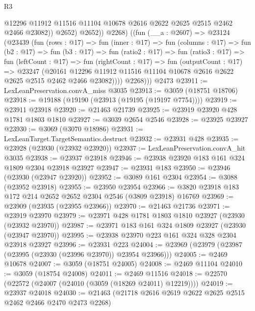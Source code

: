 \begin{lexlean}{R3}
\begin{coremodule}
                  @12296
                  @11912
                  @11516
                  @11104
                  @10678
                  @2616
                  @2622
                  @2625
                  @2515
                  @2462
                  @2466
                  @23082))
              @2652)
            @2652))
          @2268)
        ((fun (__a : @2607) =>
        @23124
          (@23439
            (fun (rows : @17) =>
            fun (inner : @17) =>
            fun (columns : @17) =>
            fun (b2 : @17) =>
            fun (b3 : @17) =>
            fun (ratio2 : @17) =>
            fun (ratio3 : @17) =>
            fun (leftCount : @17) =>
            fun (rightCount : @17) =>
            fun (outputCount : @17) =>
            @23247
              (@20161
                @12296
                @11912
                @11516
                @11104
                @10678
                @2616
                @2622
                @2625
                @2515
                @2462
                @2466
                @23082))))
          @2268)))
    @2473
@23911 := LexLeanPreservation.convA_miss @3035
@23913 := @3059 (@18751 @18706)
@23918 := @19188 (@19190 (@23913 (@19195 (@19197 @7754))))
@23919 := @23911 @23918
@23920 := @21463 @21739
@23925 := @23919 @23920 @428 @1781 @1803 @1810
@23927 := @3039 @2654 @2546
@23928 := @23925 @23927
@23930 := @3069 (@3070 @18986)
@23931 := LexLeanTarget.TargetSemantics.destruct
@23932 := @23931 @428
@23935 := @23928 (@23930 (@23932 @23920))
@23937 := LexLeanPreservation.convA_hit @3035
@23938 := @23937 @23918
@23946 := @23938 @23920 @183 @161 @324 @1809 @2304 @23918 @23927
@23947 := @23931 @183
@23950 := @23946 (@23930 (@23947 @23920))
@23952 := @3089 @161 @2304
@23954 := @3088 (@23952 @23918)
@23955 := @23950 @23954
@23966 := @3820 @23918 @183 @172 @214 @2652 @2652 @2304 @2546 (@3809 @23918) @16769
@23969 := @23909 (@23935 (@23955 @23966))
@23970 := @21463 @21736
@23971 := @23919 @23970
@23979 := @23971 @428 @1781 @1803 @1810 @23927 (@23930 (@23932 @23970))
@23987 := @23971 @183 @161 @324 @1809 @23927 (@23930 (@23947 @23970))
@23995 := @23938 @23970 @223 @161 @324 @328 @2304 @23918 @23927
@23996 := @23931 @223
@24004 := @23969 (@23979 (@23987 (@23995 (@23930 (@23996 @23970)) @23954 @23966)))
@24005 := @2469 @10678
@24007 := @3059 (@18751 @24005)
@24008 := @2469 @11104
@24010 := @3059 (@18754 @24008)
@24011 := @2469 @11516
@24018 := @22570 (@22572 (@24007 (@24010 (@3059 (@18269 @24011) @12219))))
@24019 := @23937 @24018
@24030 := @21463 (@21718 @2616 @2619 @2622 @2625 @2515 @2462 @2466 @2470 @2473 @2268)

\end{coremodule}
\end{lexlean}
